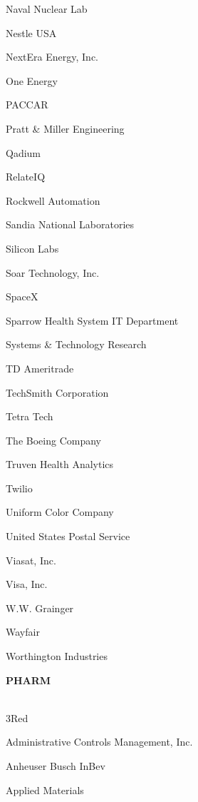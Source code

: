 \documentclass[twoside]{article}
\begin{document}
\begin{center}
\begin{multicols}{5}
\begin{FlushLeft}
\begin{compactitem}
\item Naval Nuclear Lab
\item Nestle USA
\item NextEra Energy, Inc.
\item One Energy
\item PACCAR
\item Pratt \& Miller Engineering
\item Qadium
\item RelateIQ
\item Rockwell Automation
\item Sandia National Laboratories
\item Silicon Labs
\item Soar Technology, Inc.
\item SpaceX
\item Sparrow Health System IT Department
\item Systems \& Technology Research
\item TD Ameritrade
\item TechSmith Corporation
\item Tetra Tech
\item The Boeing Company
\item Truven Health Analytics
\item Twilio
\item Uniform Color Company
\item United States Postal Service
\item Viasat, Inc.
\item Visa, Inc.
\item W.W. Grainger
\item Wayfair
\item Worthington Industries
\end{compactitem}
        \end{FlushLeft}
        \vspace{1em}
        {\fontsize{14}{16}\selectfont \bf PHARM}\\
        \vspace{-1em}
        ~\hrulefill~
        \vspace{-.9em}
        \begin{FlushLeft}
        \begin{compactitem}
        \item 3Red
\item Administrative Controls Management, Inc.
\item Anheuser Busch InBev
\item Applied Materials

\end{compactitem}
\end{FlushLeft}
\end{multicols}
\end{center}
\end{document}
